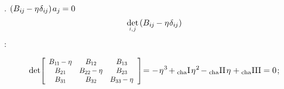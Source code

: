 \en{,}
.
${ ( B_{i\hspace{-0.1ex}j} \hspace{-0.15ex}
- \eta\hspace{.1ex} \delta_{i\hspace{-0.1ex}j} )
\hspace{.25ex} a_j \hspace{-0.1ex}
= 0 }$
\ru{,}
\begin{equation*}
\determinantby{i}{\hspace{.15ex}j}
\hspace{.3ex}
( \somebivalenttensorcomponents{i\hspace{-0.1ex}j} \hspace{-0.15ex} - \eigenvalue \delta_{ i \hspace{-0.1ex} j } )
\end{equation*}
:

\nopagebreak\vspace{-0.1em}
\begin{equation}\label{theCharacteristicEquation}
\determinant \hspace{-0.4ex}
\scalebox{.85}[.88]{$
   \left[
      \begin{array}{ccc}
         \somebivalenttensorcomponents{1\hspace{-0.1ex}1} \hspace{-0.16ex} - \eigenvalue & \somebivalenttensorcomponents{12} & \somebivalenttensorcomponents{13} \\
         \somebivalenttensorcomponents{21} & \somebivalenttensorcomponents{22} \hspace{-0.16ex} - \eigenvalue & \somebivalenttensorcomponents{23} \\
         \somebivalenttensorcomponents{31} & \somebivalenttensorcomponents{32} & \somebivalenttensorcomponents{33} \hspace{-0.16ex} - \eigenvalue
      \end{array}
   \hspace{.1ex}
   \right]
$} %
\hspace{-0.4ex} = - \hspace{.2ex}
\eigenvalue^3 \hspace{-0.25ex}
+ \firstcharacteristicinvariant \hspace{.25ex}
\eigenvalue^2 \hspace{-0.25ex}
- \secondcharacteristicinvariant \hspace{.25ex}
\eigenvalue
+ \thirdcharacteristicinvariant
= 0
\hspace{.2ex} ;
\end{equation}

